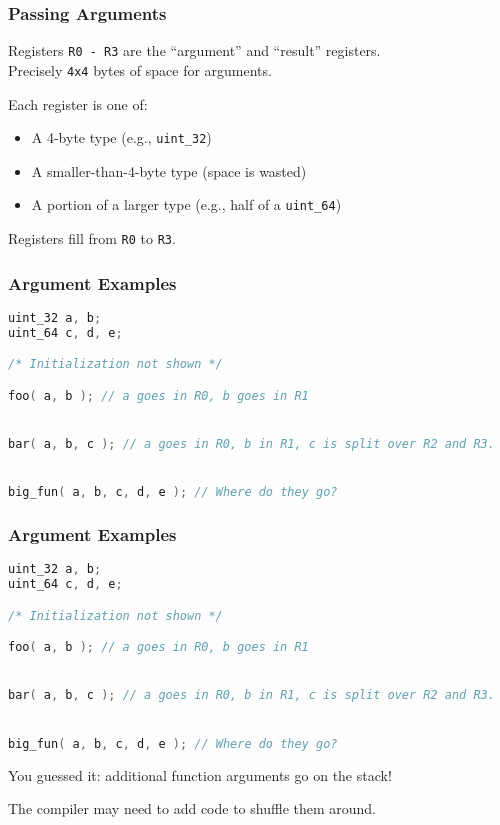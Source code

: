 \begin{frame}
\frametitle{Passing Arguments}

Registers \texttt{R0 - R3} are the ``argument'' and ``result'' registers.\\
\quad Precisely \texttt{4x4} bytes of space for arguments.

Each register is one of:\\\begin{itemize}
	\item A 4-byte type (e.g., \texttt{uint\_32})
	\item A smaller-than-4-byte type (space is wasted)
	\item A portion of a larger type (e.g., half of a \texttt{uint\_64})
\end{itemize}


Registers fill from \texttt{R0} to \texttt{R3}.


\end{frame}


\begin{frame}[fragile]
\frametitle{Argument Examples}

\begin{lstlisting}[language=C]
uint_32 a, b;
uint_64 c, d, e;

/* Initialization not shown */

foo( a, b ); // a goes in R0, b goes in R1


bar( a, b, c ); // a goes in R0, b in R1, c is split over R2 and R3.


big_fun( a, b, c, d, e ); // Where do they go?

\end{lstlisting}


\end{frame}


\begin{frame}[fragile]
\frametitle{Argument Examples}

\begin{lstlisting}[language=C]
uint_32 a, b;
uint_64 c, d, e;

/* Initialization not shown */

foo( a, b ); // a goes in R0, b goes in R1


bar( a, b, c ); // a goes in R0, b in R1, c is split over R2 and R3.


big_fun( a, b, c, d, e ); // Where do they go?

\end{lstlisting}

You guessed it: additional function arguments go on the stack!

The compiler may need to add code to shuffle them around.

\end{frame}


